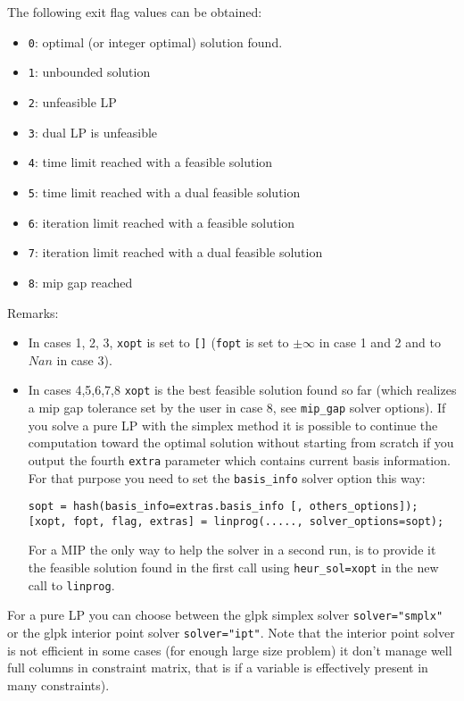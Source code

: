 \begin{mandescription}
The following exit flag values can be obtained:
\begin{itemize}
\item \verb+0+: optimal (or integer optimal) solution found.
\item \verb+1+: unbounded solution
\item \verb+2+: unfeasible LP
\item \verb+3+: dual LP is unfeasible
\item \verb+4+: time limit reached with a feasible solution
\item \verb+5+: time limit reached with a dual feasible solution
\item \verb+6+: iteration limit reached with a feasible solution
\item \verb+7+: iteration limit reached with a dual feasible solution
\item \verb+8+: mip gap reached
\end{itemize}

Remarks:
\begin{itemize}
\item In cases 1, 2, 3, \verb+xopt+ is set to \verb+[]+ (\verb+fopt+ is set to
$\pm \infty$ in case 1 and 2 and to $Nan$ in case 3). 

\item In cases 4,5,6,7,8 \verb+xopt+ is the best feasible solution found so far 
(which realizes a mip gap tolerance set by the user in case 8, 
see \verb+mip_gap+ solver options). If you solve a pure LP with the simplex
method it is possible to continue the computation toward the optimal
solution without starting from scratch if you output the fourth \verb+extra+
parameter which contains current basis information. For that purpose you
need to set the \verb+basis_info+ solver option this way:
\begin{Verbatim}
sopt = hash(basis_info=extras.basis_info [, others_options]);
[xopt, fopt, flag, extras] = linprog(....., solver_options=sopt);
\end{Verbatim}
For a MIP the only way to help the solver in a second run, is to provide 
it the feasible solution found in the first call using \verb+heur_sol=xopt+ 
in the new call to \verb+linprog+.
\end{itemize}

For a pure LP you can choose between the glpk simplex solver 
{\tt solver="smplx"} or the glpk interior point solver 
{\tt solver="ipt"}. Note that the interior point solver is
not efficient in some cases (for enough large size problem) 
it don't manage well full columns in constraint matrix, that is if a variable
is effectively present in many constraints).


\end{mandescription}
